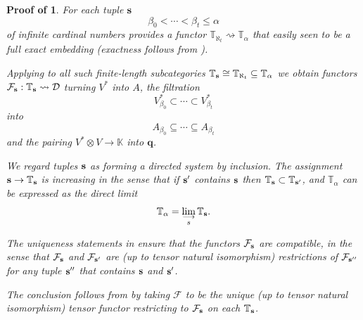 \documentclass[11pt]{article}
\theoremstyle{plain}
\theoremstyle{nonumberplain}
\theoremstyle{plain}
\theoremstyle{nonumberplain}
\newtheorem{proof-of-univ-gen}{Proof of \Cref{th.univ-gen}}
\newcommand\bK{\mathbb K}
\newcommand\bT{\mathbb T}
\newcommand\cD{\mathcal D}
\begin{document}
\begin{proof-of-univ-gen}
  For each tuple ${\bf s}$
  \begin{equation*}
    \beta_0<\cdots<\beta_t\le \alpha
  \end{equation*}
  of infinite cardinal numbers  provides a functor
  $\bT_{\aleph_t}\rightsquigarrow \bT_{\alpha}$ that easily seen to be a full exact
  embedding (exactness follows from ).

  Applying  to all such finite-length subcategories
  $\bT_{\bf s}\cong \bT_{\aleph_t}\subseteq \bT_\alpha$ we obtain
  functors $\mathcal{F}_{\bf s}:\bT_{\bf s}\rightsquigarrow \cD$ turning $V^*$ into $A$, the filtration
  \begin{equation*}
    V^*_{\beta_0}\subset \cdots\subset V^*_{\beta_t}
  \end{equation*}
into 
\begin{equation*}
  A_{\beta_0}\subseteq \cdots\subseteq A_{\beta_t}
\end{equation*}
and the pairing $V^*\otimes V\to \bK$ into $\mathbf{q}$.


We regard tuples ${\bf s}$ as forming a directed system by inclusion. The assignment ${\bf s}\to \bT_{\bf s}$ is increasing in
the sense that if ${\bf s'}$ contains ${\bf s}$ then
$\bT_{\bf s}\subset \bT_{\bf s'}$, and $\bT_{\alpha}$ can be expressed
as the direct limit
\begin{equation}\label{eq:t-unn}
  \bT_{\alpha}=\lim_{\substack{{\longrightarrow}\\{s}}} \bT_{\bf s}. 
\end{equation}

The uniqueness statements in  ensure that the functors
$\mathcal{F}_{\bf s}$ are compatible, in the sense that $\mathcal{F}_{\bf s}$ and
$\mathcal{F}_{\bf s'}$ are (up to tensor natural isomorphism) restrictions of
$\mathcal{F}_{\bf s''}$ for any tuple ${\bf s''}$ that contains
${\bf s}$ and ${\bf s'}$. 

The conclusion follows from  by taking $\mathcal{F}$ to be the
unique (up to tensor natural isomorphism) tensor functor restricting to $\mathcal{F}_{\bf s}$ on each
$\bT_{\bf s}$.
\end{proof-of-univ-gen}












{}




\Addresses
\end{document}
